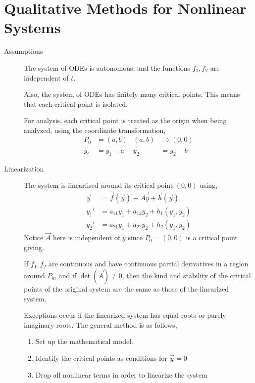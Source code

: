 \section{Qualitative Methods for Nonlinear Systems}
\begin{description}
    \item[Assumptions] The system of ODEs is autonomous, and the functions $ f_1, f_2 $
        are independent of $ t $. \par
        Also, the system of ODEs has finitely many critical points. This
        means that each critical point is isolated. \par
        For analysis, each critical point is treated as the origin when being analyzed,
        using the coordinate transformation,
        \begin{align}
            P_0         & = (a, b)  & (a, b)      & \rightarrow (0, 0) \\
            \tilde{y_i} & = y_1 - a & \tilde{y_2} & = y_2 - b
        \end{align}
    \item[Linearization] The system is linearlised around its critical point
        $ (0, 0) $ using,
        \begin{align}
            \vec{y} & = \vec{f}(\vec{y}) \equiv \vec{Ay} + \vec{h}(\vec{y}) \\
            y_1'    & = a_{11}y_1 + a_{12}y_2 + h_1(y_1, y_2)               \\
            y_2'    & = a_{21}y_1 + a_{22}y_2 + h_2(y_1, y_2)
        \end{align}
        Notice $ \vec{A} $ here is independent of $ y $ since $ P_0  = (0, 0)$ is
        a critical point giving. \par
        If $ f_1, f_2 $ are continuous and have continuous partial derivatives in a
        region around $ P_0 $, and if $ \det(\vec{A}) \neq 0 $, then the kind and
        stability of the critical points of the original system are the same as
        those of the linearized system. \par
        Exceptions occur if the linearized system has equal roots or purely imaginary
        roots.
        The general method is as follows,
        \begin{enumerate}
            \item Set up the mathematical model.
            \item Identify the critical points as conditions for $ \vec{y} = 0 $
            \item Drop all nonlinear terms in order to linearize the system

\end{enumerate}
\end{description}
